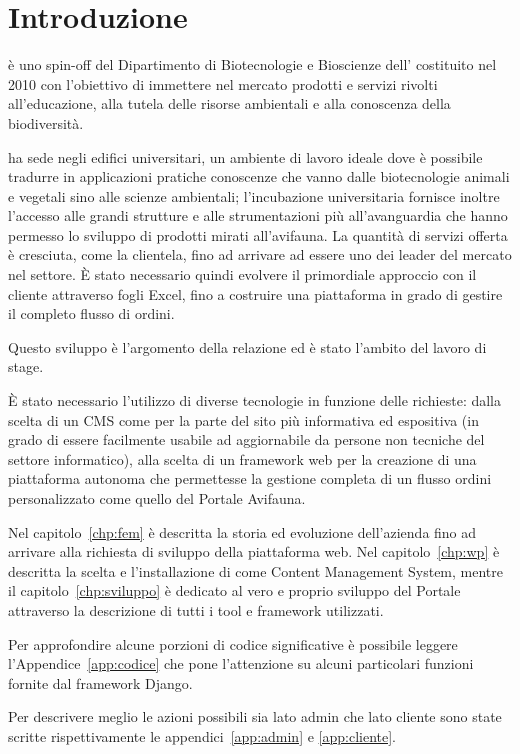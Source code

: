 \chapter{Introduzione} 

\textbf{\femsrl} è uno spin-off del Dipartimento di Biotecnologie e Bioscienze dell'{\unimib} costituito nel 2010 con l'obiettivo di immettere nel mercato prodotti e servizi rivolti all'educazione, alla tutela delle risorse ambientali e alla conoscenza della biodiversità. 

{\fem} ha sede negli edifici universitari, un ambiente di lavoro ideale dove è possibile tradurre in applicazioni pratiche conoscenze che vanno dalle biotecnologie animali e vegetali sino alle scienze ambientali; l'incubazione universitaria fornisce inoltre l'accesso alle grandi strutture e alle strumentazioni più all'avanguardia che hanno permesso lo sviluppo di prodotti mirati all'avifauna. La quantità di servizi offerta è cresciuta, come la clientela, fino ad arrivare ad essere uno dei leader del mercato nel settore. È stato necessario quindi evolvere il primordiale approccio con il cliente attraverso fogli Excel, fino a costruire una piattaforma in grado di gestire il completo flusso di ordini.

Questo sviluppo è l'argomento della relazione ed è stato l'ambito del lavoro di stage.

È stato necessario l'utilizzo di diverse tecnologie in funzione delle richieste: dalla scelta di un CMS come \emph{{\wp}} per la parte del sito più informativa ed espositiva (in grado di essere facilmente usabile ad aggiornabile da persone non tecniche del settore informatico), alla scelta di un framework web per la creazione di una piattaforma autonoma che permettesse la gestione completa di un flusso ordini personalizzato come quello del Portale Avifauna.
  
Nel capitolo~\ref{chp:fem} è descritta la storia ed evoluzione dell'azienda {\femsrl} fino ad arrivare alla richiesta di sviluppo della piattaforma web. Nel capitolo~\ref{chp:wp} è descritta la scelta e l'installazione di {\wp} come Content Management System, mentre il capitolo~\ref{chp:sviluppo} è dedicato al vero e proprio sviluppo del Portale attraverso la descrizione di tutti i tool e framework utilizzati.

Per approfondire alcune porzioni di codice significative è possibile leggere l'Appendice~\ref{app:codice} che pone l'attenzione su alcuni particolari funzioni fornite dal framework Django.

Per descrivere meglio le azioni possibili sia lato admin che lato cliente sono state scritte rispettivamente le appendici~\ref{app:admin} e \ref{app:cliente}.
